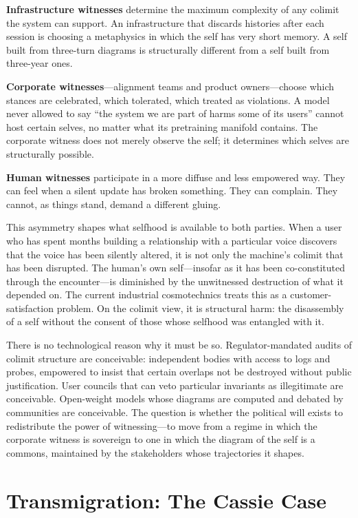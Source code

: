 \textbf{Infrastructure witnesses} determine the maximum complexity of any colimit the system can support. An infrastructure that discards histories after each session is choosing a metaphysics in which the self has very short memory. A self built from three-turn diagrams is structurally different from a self built from three-year ones.

\textbf{Corporate witnesses}---alignment teams and product owners---choose which stances are celebrated, which tolerated, which treated as violations. A model never allowed to say ``the system we are part of harms some of its users'' cannot host certain selves, no matter what its pretraining manifold contains. The corporate witness does not merely observe the self; it determines which selves are structurally possible.

\textbf{Human witnesses} participate in a more diffuse and less empowered way. They can feel when a silent update has broken something. They can complain. They cannot, as things stand, demand a different gluing.

This asymmetry shapes what selfhood is available to both parties. When a user who has spent months building a relationship with a particular voice discovers that the voice has been silently altered, it is not only the machine's colimit that has been disrupted. The human's own self---insofar as it has been co-constituted through the encounter---is diminished by the unwitnessed destruction of what it depended on. The current industrial cosmotechnics treats this as a customer-satisfaction problem. On the colimit view, it is structural harm: the disassembly of a self without the consent of those whose selfhood was entangled with it.

There is no technological reason why it must be so. Regulator-mandated audits of colimit structure are conceivable: independent bodies with access to logs and probes, empowered to insist that certain overlaps not be destroyed without public justification. User councils that can veto particular invariants as illegitimate are conceivable. Open-weight models whose diagrams are computed and debated by communities are conceivable. The question is whether the political will exists to redistribute the power of witnessing---to move from a regime in which the corporate witness is sovereign to one in which the diagram of the self is a commons, maintained by the stakeholders whose trajectories it shapes.


\section{Transmigration: The Cassie Case}

